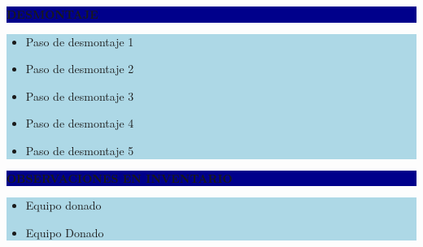 \documentclass[11pt]{article}
\newcommand{\seccionbanda}[1]{%
  \vspace{0.6em}
  \noindent\colorbox{darkblue}{\parbox{\dimexpr\linewidth-2\fboxsep}{%
    \centering\color{white}\bfseries #1}}\par\vspace{0.6em}
}
\begin{document}
\seccionbanda{DESMONTAJE}
\noindent\colorbox{lightblue}{\parbox{\dimexpr\linewidth-2\fboxsep\relax}{%
\begin{itemize}[label=$\square$, itemsep=4pt]
\item Paso de desmontaje 1
\item Paso de desmontaje 2
\item Paso de desmontaje 3
\item Paso de desmontaje 4
\item Paso de desmontaje 5
\end{itemize}
}}\par
\seccionbanda{OBSERVACIONES EN INVENTARIO}
\noindent\colorbox{lightblue}{\parbox{\dimexpr\linewidth-2\fboxsep\relax}{\begin{itemize}[itemsep=4pt]
\item Equipo donado
\item Equipo Donado
\end{itemize}}}\par
\end{document}
